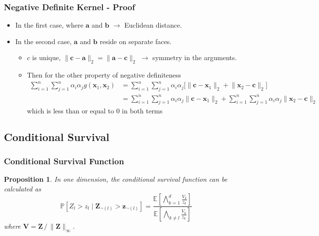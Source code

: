 \documentclass[aspectratio=169,10pt]{beamer}
\newtheorem{prop}{Proposition}
\begin{document}
\begin{frame}
    \frametitle{Negative Definite Kernel - Proof}
    \label{pgpareto:negdefkernel}
    \begin{itemize}
        \item In the first case, where $\bm{a}$ and $\bm{b}$ $\rightarrow$ Euclidean distance. 
        \item In the second case, $\bm{a}$ and $\bm{b}$ reside on separate
  faces.  
  \begin{itemize}
      \item $c$ is unique, $\lVert\bm{c} - \bm{a}\rVert_2 = \lVert\bm{a} - \bm{c}\rVert_2$ $\rightarrow$ symmetry in the arguments.
      \item Then for the other property of negative definiteness
  \begin{equation*}
    \begin{aligned}
      \sum_{i = 1}^n\sum_{j = 1}^n \alpha_i\alpha_j g(\bm{x}_1,\bm{x}_2) &= \sum_{i = 1}^n\sum_{j = 1}^n \alpha_i\alpha_j \bigg[\lVert\bm{c} - \bm{x}_1\rVert_2 + \lVert\bm{x}_2 - \bm{c}\rVert_2\bigg]\\
      &= \sum_{i = 1}^n\sum_{j = 1}^n \alpha_i\alpha_j\lVert\bm{c} - \bm{x}_1\rVert_2 + \sum_{i = 1}^n\sum_{j = 1}^n \alpha_i\alpha_j\lVert\bm{x}_2 - \bm{c}\rVert_2
    \end{aligned}
  \end{equation*}
  which is less than or equal to $0$ in both terms
  \end{itemize} 
  \end{itemize}
\end{frame}

\subsection*{Conditional Survival}

\begin{frame}
  \frametitle{Conditional Survival Function}
  \begin{prop}
      In one dimension, the conditional survival function can be calculated as
    \[
        \mathbb{P}\left[Z_l > z_l\mid \bm{Z}_{\neg(l)} > \bm{z}_{\neg(l)}\right] =
        \frac{\mathbb{E}\left[\bigwedge_{k = 1}^d \frac{V_k}{z_k}\right]}{
                      \mathbb{E}\left[\bigwedge_{k \neq l}\frac{V_k}{z_k}\right]}
    \]
      where $\bm{V} = \bm{Z}\,/\,\lVert\bm{Z}\rVert_{\infty}$.
  \end{prop}
\end{frame} %
\end{document}
